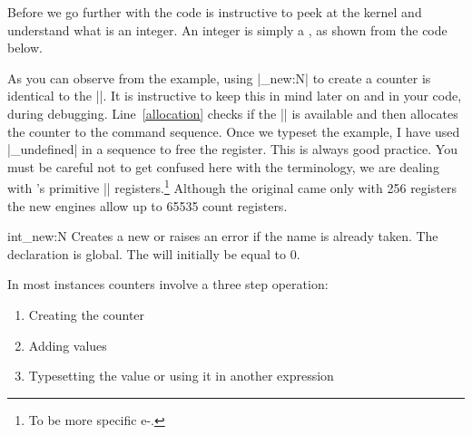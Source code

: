  

  Before we go further with the code is instructive to peek at the  kernel and understand what is an integer. An integer is simply a \tex {}, as shown from the code below.
  
  

   
 
 As you can observe from the example, using |\int_new:N| to create a counter is identical to the \latexe |\newcount|. It is instructive to keep this in mind later on and in your code, during debugging. Line~\ref{allocation} checks if the |\count| is available and then allocates the counter to the command sequence.
 Once we typeset the example, I have used |\cs_undefined| in a sequence to free the register. This is always good practice.  You must be careful not to get confused here with the terminology, we are dealing with \tex’s primitive |\count| registers.\footnote{To be more specific e-\tex.} Although the original \tex came only with 256 registers the new engines allow up to 65535 count registers. 
  
 \begin{docCommand}{int_new:N}{}
   Creates a new  or raises an error if the name is
   already taken. The declaration is global. The  will
   initially be equal to $0$.
 \end{docCommand}
 
 In most instances counters involve a three step operation:
 
 \begin{enumerate}
 \item Creating the counter
 \item Adding values
 \item Typesetting the value or using it in another expression
 \end{enumerate}
 

